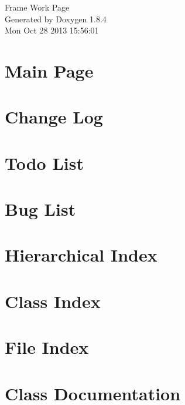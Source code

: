 \documentclass[twoside]{article}
\begin{document}
\hypersetup{pageanchor=false}
\begin{titlepage}
\vspace*{7cm}
\begin{center}%
{\Large Frame Work Page }\\
\vspace*{1cm}
{\large Generated by Doxygen 1.8.4}\\
\vspace*{0.5cm}
{\small Mon Oct 28 2013 15:56:01}\\
\end{center}
\end{titlepage}
\tableofcontents
{}
\hypersetup{pageanchor=true}

\section{Main Page}
\label{index}\hypertarget{index}{}
\section{Change Log}
\label{md_ChangeLog}
\hypertarget{md_ChangeLog}{}

\section{Todo List}
\label{todo}
\hypertarget{todo}{}

\section{Bug List}
\label{bug}
\hypertarget{bug}{}

\section{Hierarchical Index}

\section{Class Index}

\section{File Index}

\section{Class Documentation}






























\end{document}
